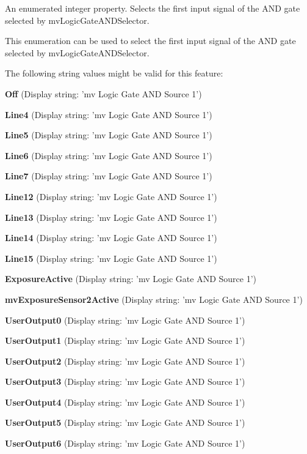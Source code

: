 An enumerated integer property. Selects the first input signal of the A\+N\+D gate selected by mv\+Logic\+Gate\+A\+N\+D\+Selector. 

This enumeration can be used to select the first input signal of the A\+N\+D gate selected by mv\+Logic\+Gate\+A\+N\+D\+Selector.

The following string values might be valid for this feature\+:
\begin{DoxyItemize}
\item {\bfseries Off} (Display string\+: 'mv Logic Gate A\+N\+D Source 1')
\item {\bfseries Line4} (Display string\+: 'mv Logic Gate A\+N\+D Source 1')
\item {\bfseries Line5} (Display string\+: 'mv Logic Gate A\+N\+D Source 1')
\item {\bfseries Line6} (Display string\+: 'mv Logic Gate A\+N\+D Source 1')
\item {\bfseries Line7} (Display string\+: 'mv Logic Gate A\+N\+D Source 1')
\item {\bfseries Line12} (Display string\+: 'mv Logic Gate A\+N\+D Source 1')
\item {\bfseries Line13} (Display string\+: 'mv Logic Gate A\+N\+D Source 1')
\item {\bfseries Line14} (Display string\+: 'mv Logic Gate A\+N\+D Source 1')
\item {\bfseries Line15} (Display string\+: 'mv Logic Gate A\+N\+D Source 1')
\item {\bfseries Exposure\+Active} (Display string\+: 'mv Logic Gate A\+N\+D Source 1')
\item {\bfseries mv\+Exposure\+Sensor2\+Active} (Display string\+: 'mv Logic Gate A\+N\+D Source 1')
\item {\bfseries User\+Output0} (Display string\+: 'mv Logic Gate A\+N\+D Source 1')
\item {\bfseries User\+Output1} (Display string\+: 'mv Logic Gate A\+N\+D Source 1')
\item {\bfseries User\+Output2} (Display string\+: 'mv Logic Gate A\+N\+D Source 1')
\item {\bfseries User\+Output3} (Display string\+: 'mv Logic Gate A\+N\+D Source 1')
\item {\bfseries User\+Output4} (Display string\+: 'mv Logic Gate A\+N\+D Source 1')
\item {\bfseries User\+Output5} (Display string\+: 'mv Logic Gate A\+N\+D Source 1')
\item {\bfseries User\+Output6} (Display string\+: 'mv Logic Gate A\+N\+D Source 1')

\end{DoxyItemize}
